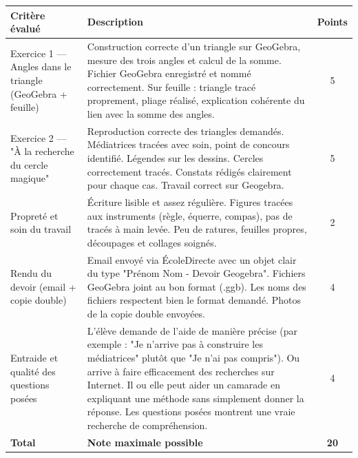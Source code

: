 \documentclass[answers]{exam}
\begin{document}
{
  \setlength{\LTright}{0pt}    %

\centering
\begin{longtable}{|L{0.3\textwidth}|L{0.7\textwidth}|c|}
\hline
{}
\textbf{Critère évalué} & \textbf{Description} & \textbf{Points} \\[2pt]
\hline

  Exercice 1 — Angles dans le triangle (GeoGebra + feuille)
  & Construction correcte d'un triangle sur GeoGebra, mesure des trois angles et calcul de la somme.  
  Fichier GeoGebra enregistré et nommé correctement.  
  Sur feuille : triangle tracé proprement, pliage réalisé, explication cohérente du lien avec la somme des angles.
  & 5 \\
\hline

  Exercice 2 — "À la recherche du cercle magique"
  & Reproduction correcte des triangles demandés.  
  Médiatrices tracées avec soin, point de concours identifié. Légendes sur les dessins.
  Cercles correctement tracés.  
  Constats rédigés clairement pour chaque cas. Travail correct sur Geogebra.
  & 5 \\
\hline

  Propreté et soin du travail
  & Écriture lisible et assez régulière.  
  Figures tracées aux instruments (règle, équerre, compas), pas de tracés à main levée.  
  Peu de ratures, feuilles propres, découpages et collages soignés.
  & 2 \\
\hline

  Rendu du devoir (email + copie double)
  & Email envoyé via ÉcoleDirecte avec un objet clair du type "Prénom Nom - Devoir Geogebra".  
  Fichiers GeoGebra joint au bon format (.ggb). Les noms des fichiers respectent bien le format demandé. 
  Photos de la copie double envoyées.
  & 4 \\
\hline

  Entraide et qualité des questions posées
  & L'élève demande de l'aide de manière précise (par exemple : "Je n'arrive pas à construire les médiatrices" plutôt que "Je n'ai pas compris"). Ou arrive à faire efficacement des recherches sur Internet.
  Il ou elle peut aider un camarade en expliquant une méthode sans simplement donner la réponse.  
  Les questions posées montrent une vraie recherche de compréhension.
  & 4 \\
\hline

 \textbf{Total} & \textbf{Note maximale possible} & \textbf{20} \\
\hline

\end{longtable}
}
\end{document}
